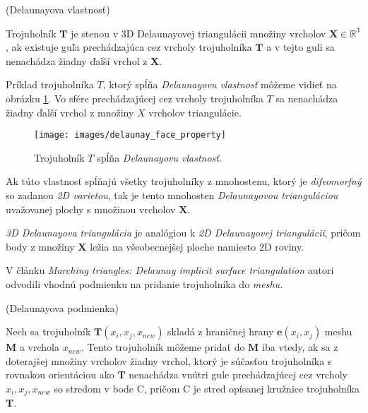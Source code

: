 \begin{definition}
    (Delaunayova vlastnosť)

    Trojuholník $\mathbf{T}$ je stenou v 3D Delaunayovej triangulácii množiny vrcholov 
    $\mathbf{X}\in \mathbb{R}^3$, ak existuje guľa prechádzajúca cez vrcholy trojuholníka 
    $\mathbf{T}$ a v tejto guli sa nenachádza žiadny ďalší vrchol z $\mathbf{X}$. 
\end{definition}

Príklad trojuholníka $T$, ktorý spĺňa \textit{Delaunayovu vlastnosť} môžeme vidieť na obrázku 
\ref{obr:delaunay_face_property}. Vo sfére prechádzajúcej cez vrcholy trojuholníka $T$ 
sa nenachádza žiadny ďalší vrchol z množiny $X$ vrcholov triangulácie.

\begin{figure}
    \centerline{\texttt{[image: images/delaunay\_face\_property]}}
    \caption[Trojuholník $T$ spĺňajúci Delaunayovu vlastnosť]
    {\cite{hilton1996marching} Trojuholník $T$ spĺňa \textit{Delaunayovu vlastnosť}.}
    \label{obr:delaunay_face_property}
\end{figure}

Ak túto vlastnosť spĺňajú všetky trojuholníky z mnohostenu, ktorý je \textit{difeomorfný} so zadanou
\textit{2D varietou}, tak je tento mnohosten \textit{Delaunayovou trianguláciou} uvažovanej plochy
s množinou vrcholov $\mathbf{X}$.

\textit{3D Delaunayova triangulácia} je analógiou k \textit{2D Delaunayovej triangulácii}, pričom
body z množiny $\mathbf{X}$ ležia na všeobecnejšej ploche namiesto 2D roviny.

V článku \textit{Marching triangles: Delaunay implicit surface triangulation} \cite{hilton1997marching}
autori odvodili vhodnú podmienku na pridanie trojuholníka do \textit{meshu}.

\begin{definition}
    (Delaunayova podmienka)
    \label{def:delaunay_constraint}

    Nech sa trojuholník $\mathbf{T}(x_i, x_j, x_{new})$ skladá z hraničnej hrany $\mathbf{e}(x_i, x_j)$ 
    meshu $\mathbf{M}$ a vrchola $x_{new}$. Tento trojuholník môžeme pridať do 
    $\mathbf{M}$ iba vtedy, ak sa z doterajšej 
    množiny vrcholov žiadny vrchol, ktorý je súčasťou trojuholníka s rovnakou orientáciou ako 
    $\mathbf{T}$ nenachádza vnútri gule prechádzajúcej cez vrcholy $x_i, x_j, x_{new}$ so stredom 
    v bode C, pričom C je stred opísanej kružnice trojuholníka $\mathbf{T}$.
\end{definition}

